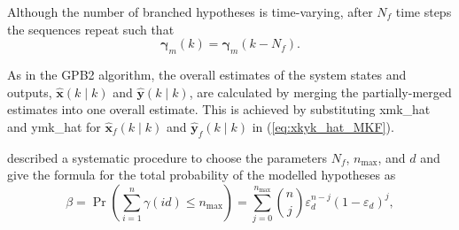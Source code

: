 Although the number of branched hypotheses is time-varying, after $N_f$ time steps the sequences repeat such that
%
\begin{equation} \label{eq:rmkrmkmNf_SFex2}
	\mathbf{\gamma}_m(k) = \mathbf{\gamma}_m(k-N_f).
\end{equation}

As in the \gls{GPB2} algorithm, the overall estimates of the system states and outputs, $\hat{\mathbf{x}}(k \mid k)$ and $\hat{\mathbf{y}}(k \mid k)$, are calculated by merging the partially-merged estimates into one overall estimate. This is achieved by substituting \gls{xmk_hat} and \gls{ymk_hat} for $\mathbf{\hat{x}}_f(k \mid k)$ and $\mathbf{\hat{y}}_f(k \mid k)$ in (\ref{eq:xkyk_hat_MKF}).

\cite{robertson_detection_1995} described a systematic procedure to choose the parameters $N_f$, $n_\text{max}$, and $d$ and give the formula for the total probability of the modelled hypotheses as
\begin{equation} \label{eq:p_gamma}
	\beta=\operatorname{Pr}\left(\sum_{i=1}^{n} \gamma(i d) \leq n_\text{max} \right) = \sum_{j=0}^{n_\text{max}} \binom{n}{j} \varepsilon_d^{n-j}(1-\varepsilon_d)^{j},
\end{equation}
%

